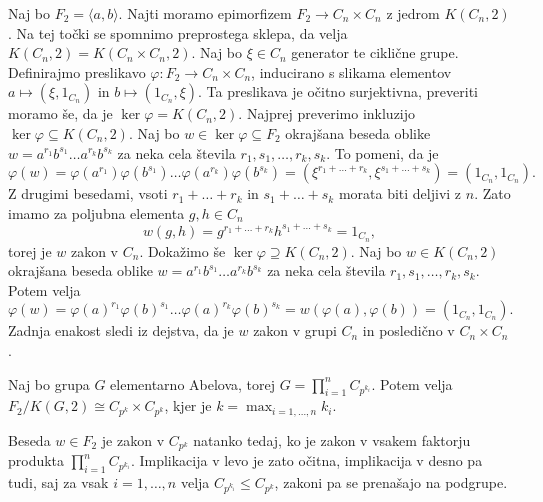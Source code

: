 \begin{dokaz}
Naj bo $F_2 = \langle a, b \rangle$.
Najti moramo epimorfizem $F_2 \to C_n \times C_n$ z jedrom $K(C_n ,2)$. Na tej točki se spomnimo preprostega sklepa, da velja $K(C_n, 2) = K(C_n \times C_n, 2)$. Naj bo $\xi \in C_n$ generator te ciklične grupe. Definirajmo preslikavo $\varphi: F_2 \to C_n \times C_n$,
inducirano s slikama elementov $a \mapsto (\xi, 1_{C_n})$ in $b \mapsto (1_{C_n}, \xi)$.
Ta preslikava je očitno surjektivna, preveriti moramo še, da je $\ker \varphi = K(C_n, 2)$. Najprej preverimo inkluzijo $\ker \varphi \subseteq K(C_n, 2)$.
Naj bo $w  \in \ker \varphi \subseteq  F_2$ okrajšana beseda oblike $w = a^{r_1} b^{s_1} \ldots a^{r_{k}} b^{s_k}$ za neka cela števila $r_1, s_1, \ldots , r_k , s_k$. To pomeni, da je \begin{equation*}
\varphi(w) = \varphi(a^{r_1}) \varphi(b^{s_1}) \ldots \varphi(a^{r_k}) \varphi(b^{s_k}) = \left( \xi^{r_1 + \ldots + r_k}, \xi^{s_1 + \ldots + s_k} \right) = \left( 1_{C_n} , 1_{C_n} \right).
\end{equation*}  
Z drugimi besedami, vsoti $r_1 + \ldots + r_k$ in $s_1 + \ldots + s_k$ morata biti deljivi z $n$. Zato imamo za poljubna elementa $g, h \in C_n$ \begin{equation*}
w(g, h) =  g^{r_1 + \ldots + r_k} h^{s_1 + \ldots + s_k} = 1_{C_n},
\end{equation*}
torej je $w$ zakon v $C_n$. Dokažimo še $\ker \varphi \supseteq K(C_n, 2)$. Naj bo $w \in K(C_n, 2)$ okrajšana beseda oblike $w = a^{r_1} b^{s_1} \ldots a^{r_{k}} b^{s_k}$ za neka cela števila $r_1, s_1, \ldots , r_k , s_k$.
Potem velja \begin{equation*}
    \varphi(w) = \varphi(a)^{r_1} \varphi(b)^{s_1} \ldots \varphi(a)^{r_k} \varphi(b)^{s_k} = w(\varphi(a), \varphi(b)) = (1_{C_n} , 1_{C_n}).
    \end{equation*}
    Zadnja enakost sledi iz dejstva, da je $w$ zakon v grupi $C_n$ in posledično v $C_n \times C_n$.
\end{dokaz}
\begin{posledica}
\label{psl_lastnosti_zakonov_elementarno_abelove}
Naj bo grupa $G$ elementarno Abelova, torej $G = \prod_{i = 1}^{n} C_{p^{k_{i}}}$. Potem velja $F_2 / K(G, 2) \cong C_{p^{k}} \times C_{p^{k}}$, kjer je $k = \max_{i = 1 , \ldots , n} k_i$.
\end{posledica}
\begin{dokaz}
 Beseda $w \in F_2$ je zakon v $C_{p^{k}}$ natanko tedaj, ko je zakon v vsakem faktorju produkta $\prod_{i = 1}^{n} C_{p^{k_{i}}}$. Implikacija v levo je zato očitna, implikacija v desno pa tudi,
saj za vsak $i = 1 , \ldots , n$ velja $C_{p^{k_{i}}} \le C_{p^{k}}$, zakoni pa se prenašajo na podgrupe.
\end{dokaz}

